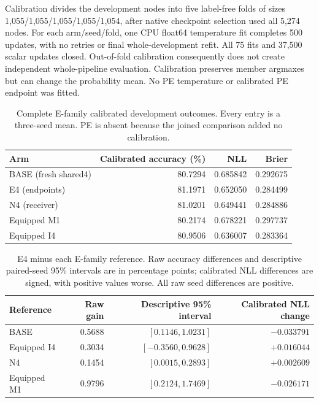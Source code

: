 Calibration divides the development nodes into five label-free folds of sizes 1,055/1,055/1,055/1,055/1,054, after native checkpoint selection used all 5,274 nodes. For each arm/seed/fold, one CPU float64 temperature fit completes 500 updates, with no retries or final whole-development refit. All 75 fits and 37,500 scalar updates closed. Out-of-fold calibration consequently does not create independent whole-pipeline evaluation. Calibration preserves member argmaxes but can change the probability mean. No PE temperature or calibrated PE endpoint was fitted.

\begin{table}[t]
\centering\small\setlength{\tabcolsep}{5pt}
\caption{Complete E-family calibrated development outcomes. Every entry is a three-seed mean. PE is absent because the joined comparison added no calibration.}
\label{tab:E-calibrated}
\begin{tabular}{lrrr}
\toprule
Arm & Calibrated accuracy (\%) & NLL & Brier\\
\midrule
BASE (fresh shared4) & 80.7294 & 0.685842 & 0.292675\\
E4 (endpoints) & 81.1971 & 0.652050 & 0.284499\\
N4 (receiver) & 81.0201 & 0.649441 & 0.284886\\
Equipped M1 & 80.2174 & 0.678221 & 0.297737\\
Equipped I4 & 80.9506 & 0.636007 & 0.283364\\
\bottomrule\end{tabular}\end{table}

\begin{table}[t]
\centering\small\setlength{\tabcolsep}{5pt}
\caption{E4 minus each E-family reference. Raw accuracy differences and descriptive paired-seed 95\% intervals are in percentage points; calibrated NLL differences are signed, with positive values worse. All raw seed differences are positive.}
\label{tab:E-paired}
\begin{tabular}{lrrr}
\toprule
Reference & Raw gain & Descriptive 95\% interval & Calibrated NLL change\\
\midrule
BASE & 0.5688 & $[0.1146,1.0231]$ & $-0.033791$\\
Equipped I4 & 0.3034 & $[-0.3560,0.9628]$ & $+0.016044$\\
N4 & 0.1454 & $[0.0015,0.2893]$ & $+0.002609$\\
Equipped M1 & 0.9796 & $[0.2124,1.7469]$ & $-0.026171$\\
\bottomrule\end{tabular}\end{table}

